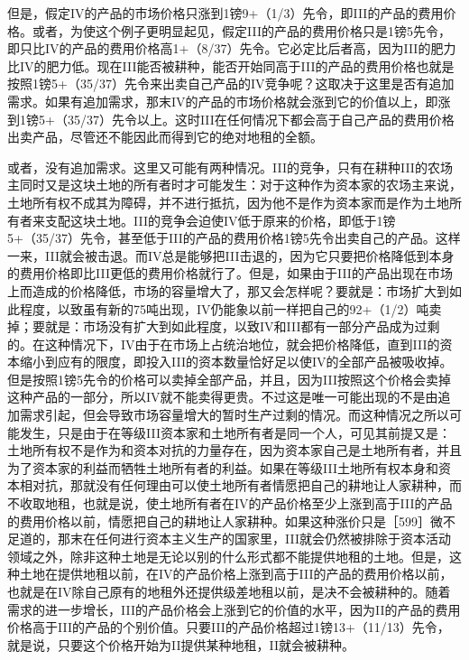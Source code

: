 但是，假定IV的产品的市场价格只涨到1镑9+（1/3）先令，即III的产品的费用价格。或者，为使这个例子更明显起见，假定III的产品的费用价格只是1镑5先令，即只比IV的产品的费用价格高1+（8/37）先令。它必定比后者高，因为III的肥力比IV的肥力低。现在III能否被耕种，能否开始同高于III的产品的费用价格也就是按照1镑5+（35/37）先令来出卖自己产品的IV竞争呢？这取决于这里是否有追加需求。如果有追加需求，那末IV的产品的市场价格就会涨到它的价值以上，即涨到1镑5+（35/37）先令以上。这时III在任何情况下都会高于自己产品的费用价格出卖产品，尽管还不能因此而得到它的绝对地租的全额。

或者，没有追加需求。这里又可能有两种情况。III的竞争，只有在耕种III的农场主同时又是这块土地的所有者时才可能发生：对于这种作为资本家的农场主来说，土地所有权不成其为障碍，并不进行抵抗，因为他不是作为资本家而是作为土地所有者来支配这块土地。III的竞争会迫使IV低于原来的价格，即低于1镑5+（35/37）先令，甚至低于III的产品的费用价格1镑5先令出卖自己的产品。这样一来，III就会被击退。而IV总是能够把III击退的，因为它只要把价格降低到本身的费用价格即比III更低的费用价格就行了。但是，如果由于III的产品出现在市场上而造成的价格降低，市场的容量增大了，那又会怎样呢？要就是：市场扩大到如此程度，以致虽有新的75吨出现，IV仍能象以前一样把自己的92+（1/2）吨卖掉；要就是：市场没有扩大到如此程度，以致IV和III都有一部分产品成为过剩的。在这种情况下，IV由于在市场上占统治地位，就会把价格降低，直到III的资本缩小到应有的限度，即投入III的资本数量恰好足以使IV的全部产品被吸收掉。但是按照1镑5先令的价格可以卖掉全部产品，并且，因为III按照这个价格会卖掉这种产品的一部分，所以IV就不能卖得更贵。不过这是唯一可能出现的不是由追加需求引起，但会导致市场容量增大的暂时生产过剩的情况。而这种情况之所以可能发生，只是由于在等级III资本家和土地所有者是同一个人，可见其前提又是：土地所有权不是作为和资本对抗的力量存在，因为资本家自己是土地所有者，并且为了资本家的利益而牺牲土地所有者的利益。如果在等级III土地所有权本身和资本相对抗，那就没有任何理由可以使土地所有者情愿把自己的耕地让人家耕种，而不收取地租，也就是说，使土地所有者在IV的产品价格至少上涨到高于III的产品的费用价格以前，情愿把自己的耕地让人家耕种。如果这种涨价只是［599］微不足道的，那末在任何进行资本主义生产的国家里，III就会仍然被排除于资本活动领域之外，除非这种土地是无论以别的什么形式都不能提供地租的土地。但是，这种土地在提供地租以前，在IV的产品价格上涨到高于III的产品的费用价格以前，也就是在IV除自己原有的地租外还提供级差地租以前，是决不会被耕种的。随着需求的进一步增长，III的产品价格会上涨到它的价值的水平，因为II的产品的费用价格高于III的产品的个别价值。只要III的产品价格超过1镑13+（11/13）先令，就是说，只要这个价格开始为II提供某种地租，II就会被耕种。

